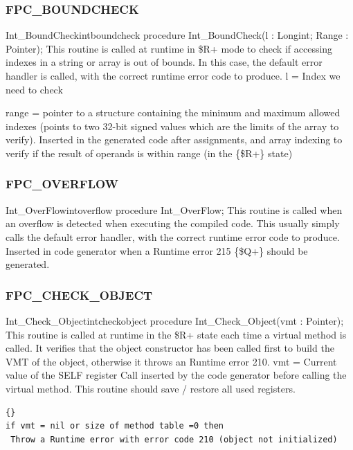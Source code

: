 \documentclass [12pt]{article}
\begin{document}
\subsubsection{FPC{\_}BOUNDCHECK}
\label{subsubsec:mylabel53}

\begin{procedurel}{Int{\_}BoundCheck}{intboundcheck}
\Declaration
procedure Int{\_}BoundCheck(l : Longint; Range : Pointer);
\Description 
This routine is called at runtime in {\$}R+ mode to check if accessing
indexes in a string or array is out of bounds. In this case, the default
error handler is called, with the correct runtime error code to produce.
\Parameters 
l = Index we need to check  \par 
range = pointer to a structure containing the minimum and maximum allowed
indexes (points to two 32-bit signed values which are the limits of the
array to verify).
\Notes 
Inserted in the generated code after assignments, and array indexing to
verify if the result of operands is within range (in the {\{}{\$}R+{\}}
state)
\end{procedurel}

\subsubsection{FPC{\_}OVERFLOW}
\label{subsubsec:mylabel54}

\begin{procedurel}{Int{\_}OverFlow}{intoverflow}
\Declaration
procedure Int{\_}OverFlow;
\Description 
This routine is called when an overflow is detected when executing the
compiled code. This usually simply calls the default error handler, with the
correct runtime error code to produce.
\Parameters 
Inserted in code generator when a Runtime error 215 {\{}{\$}Q+{\}} should be
generated.
\end{procedurel}

\subsubsection{FPC{\_}CHECK{\_}OBJECT}
\label{subsubsec:mylabel55}

\begin{procedurel}{Int{\_}Check{\_}Object}{intcheckobject}
\Declaration
procedure Int{\_}Check{\_}Object(vmt : Pointer);
\Description 
This routine is called at runtime in the {\$}R+ state each time a virtual
method is called. It verifies that the object constructor has been called
first to build the VMT of the object, otherwise it throws an Runtime error 210.
\Parameters 
vmt = Current value of the SELF register 
\Notes 
Call inserted by the code generator before calling the virtual method. This
routine should save / restore all used registers.
\Algorithm
\begin{lstlisting}{}
if vmt = nil or size of method table =0 then
 Throw a Runtime error with error code 210 (object not initialized)
\end{lstlisting}
\end{procedurel}
\end{document}
